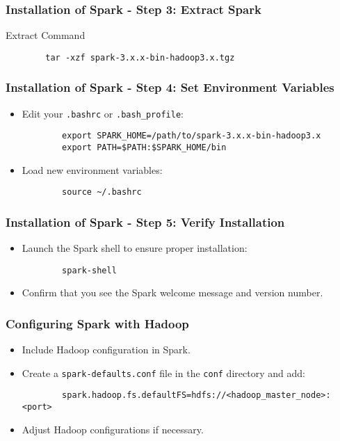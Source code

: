 \documentclass[aspectratio=169]{beamer}
\begin{document}
\begin{frame}[fragile]
    \frametitle{Installation of Spark - Step 3: Extract Spark}
    \begin{block}{Extract Command}
        \begin{lstlisting}
        tar -xzf spark-3.x.x-bin-hadoop3.x.tgz
        \end{lstlisting}
    \end{block}
\end{frame}

\begin{frame}[fragile]
    \frametitle{Installation of Spark - Step 4: Set Environment Variables}
    \begin{itemize}
        \item Edit your \texttt{.bashrc} or \texttt{.bash_profile}:
        \begin{lstlisting}
        export SPARK_HOME=/path/to/spark-3.x.x-bin-hadoop3.x
        export PATH=$PATH:$SPARK_HOME/bin
        \end{lstlisting}
        \item Load new environment variables:
        \begin{lstlisting}
        source ~/.bashrc
        \end{lstlisting}
    \end{itemize}
\end{frame}

\begin{frame}[fragile]
    \frametitle{Installation of Spark - Step 5: Verify Installation}
    \begin{itemize}
        \item Launch the Spark shell to ensure proper installation:
        \begin{lstlisting}
        spark-shell
        \end{lstlisting}
        \item Confirm that you see the Spark welcome message and version number.
    \end{itemize}
\end{frame}

\begin{frame}[fragile]
    \frametitle{Configuring Spark with Hadoop}
    \begin{itemize}
        \item Include Hadoop configuration in Spark.
        \item Create a \texttt{spark-defaults.conf} file in the \texttt{conf} directory and add:
        \begin{lstlisting}
        spark.hadoop.fs.defaultFS=hdfs://<hadoop_master_node>:<port>
        \end{lstlisting}
        \item Adjust Hadoop configurations if necessary.
    \end{itemize}
\end{frame}
\end{document}
